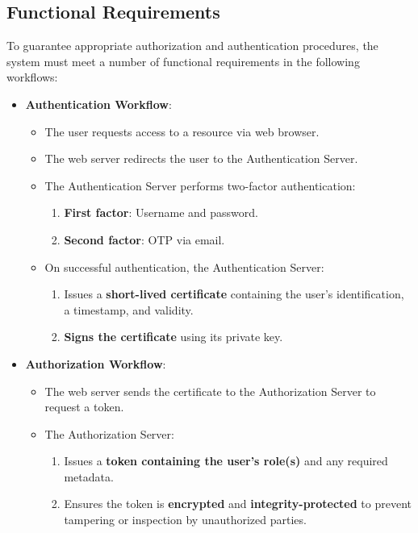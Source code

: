 \documentclass[10pt]{article}
\begin{document}
\subsection{Functional Requirements}

To guarantee appropriate authorization and authentication procedures, the system must meet a number of functional requirements in the following workflows:

\begin{itemize}
    \item \textbf{Authentication Workflow}:
        \begin{itemize}
            \item The user requests access to a resource via web browser.
            \item The web server redirects the user to the Authentication Server.
            \item The Authentication Server performs two-factor authentication:
            \begin{enumerate}
                \item \textbf{First factor}: Username and password.
                \item \textbf{Second factor}: OTP via email. 
            \end{enumerate}
            \item On successful authentication, the Authentication Server:
            \begin{enumerate}
                \item Issues a \textbf{short-lived certificate} containing the user’s identification, a timestamp, and validity.
                \item \textbf{Signs the certificate} using its private key.
            \end{enumerate}
        \end{itemize}
    \item \textbf{Authorization Workflow}:
        \begin{itemize}
            \item The web server sends the certificate to the Authorization Server to request a token.
            \item The Authorization Server:
            \begin{enumerate}
                \item Issues a \textbf{token containing the user’s role(s)} and any required metadata.
                \item Ensures the token is \textbf{encrypted} and \textbf{integrity-protected} to prevent tampering or inspection by unauthorized parties.

\end{enumerate}
\end{itemize}
\end{itemize}
\end{document}
